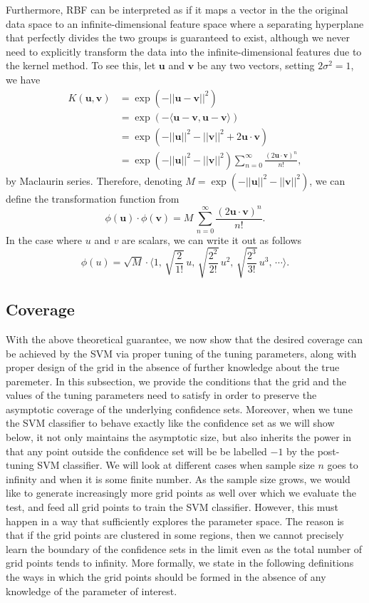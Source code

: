 \documentclass[12pt]{article}
\theoremstyle{definition}
\begin{document}
Furthermore, RBF can be interpreted as if it maps a vector in the the original data space to an infinite-dimensional feature space where a separating hyperplane that perfectly divides the two groups is guaranteed to exist, although we never need to explicitly transform the data into the infinite-dimensional features due to the kernel method. To see this, let $\mathbf{u}$ and $\mathbf{v}$ be any two vectors, setting $2\sigma^2=1$, we have
\begin{align*}
K(\mathbf{u},\mathbf{v}) &= \exp(-||\mathbf{u}-\mathbf{v}||^2)\\
&=\exp(-\langle \mathbf{u}-\mathbf{v},\mathbf{u}-\mathbf{v}\rangle)\\
&=\exp(-||\mathbf{u}||^2-||\mathbf{v}||^2+2\mathbf{u}\cdot\mathbf{v})\\
&=\exp(-||\mathbf{u}||^2-||\mathbf{v}||^2)\sum_{n=0}^\infty \frac{(2\mathbf{u}\cdot\mathbf{v})^n}{n!},
\end{align*}
by Maclaurin series. Therefore, denoting $M=\exp(-||\mathbf{u}||^2-||\mathbf{v}||^2)$, we can define the transformation function from
$$\phi(\mathbf{u})\cdot\phi(\mathbf{v})=M\,\sum_{n=0}^\infty\frac{(2\mathbf{u}\cdot\mathbf{v})^n}{n!}.$$
In the case where $u$ and $v$ are scalars, we can write it out as follows 
$$\phi(u)=\sqrt{M}\cdot \bigg\langle 1, \,\sqrt{\frac{2}{1!}}\, u,\,\sqrt{\frac{2^2}{2!}}\,u^2,\,\sqrt{\frac{2^3}{3!}}\,u^3,\,\cdots \bigg\rangle.$$




\subsection{Coverage}
With the above theoretical guarantee, we now show that the desired coverage can be achieved by the SVM via proper tuning of the tuning parameters, along with proper design of the grid in the absence of further knowledge about the true paremeter. In this subsection, we provide the conditions that the grid and the values of the tuning parameters need to satisfy in order to preserve the asymptotic coverage of the underlying confidence sets. Moreover, when we tune the SVM classifier to behave exactly like the confidence set as we will show below, it not only maintains the asymptotic size, but also inherits the power in that any point outside the confidence set will be be labelled $-1$ by the post-tuning SVM classifier. We will look at different cases when sample size $n$ goes to infinity and when it is some finite number. As the sample size grows, we would like to generate increasingly more grid points as well over which we evaluate the test, and feed all grid points to train the SVM classifier. However, this must happen in a way that sufficiently explores the parameter space. The reason is that if the grid points are clustered in some regions, then we cannot precisely learn the boundary of the confidence sets in the limit even as the total number of grid points tends to infinity. More formally, we state in the following definitions the ways in which the grid points should be formed in the absence of any knowledge of the parameter of interest. 
\end{document}
